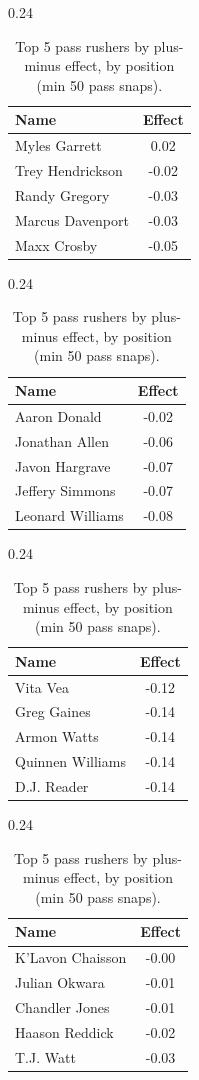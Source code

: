 \begin{table}[h!]
\centering
\begin{subtable}{0.24\textwidth}
\centering
\footnotesize
\begin{tabular}{lc}
\toprule
Name & Effect \\
\midrule
Myles Garrett & 0.02 \\
Trey Hendrickson & -0.02 \\
Randy Gregory & -0.03 \\
Marcus Davenport & -0.03 \\
Maxx Crosby & -0.05 \\
\bottomrule
\end{tabular}
\caption{DE}
\end{subtable}
\hfill
\begin{subtable}{0.24\textwidth}
\centering
\footnotesize
\begin{tabular}{lc}
\toprule
Name & Effect \\
\midrule
Aaron Donald & -0.02 \\
Jonathan Allen & -0.06 \\
Javon Hargrave & -0.07 \\
Jeffery Simmons & -0.07 \\
Leonard Williams & -0.08 \\
\bottomrule
\end{tabular}
\caption{DT}
\end{subtable}
\hfill
\begin{subtable}{0.24\textwidth}
\centering
\footnotesize
\begin{tabular}{lc}
\toprule
Name & Effect \\
\midrule
Vita Vea & -0.12 \\
Greg Gaines & -0.14 \\
Armon Watts & -0.14 \\
Quinnen Williams & -0.14 \\
D.J. Reader & -0.14 \\
\bottomrule
\end{tabular}
\caption{NT}
\end{subtable}
\hfill
\begin{subtable}{0.24\textwidth}
\centering
\footnotesize
\begin{tabular}{lc}
\toprule
Name & Effect \\
\midrule
K'Lavon Chaisson & -0.00 \\
Julian Okwara & -0.01 \\
Chandler Jones & -0.01 \\
Haason Reddick & -0.02 \\
T.J. Watt & -0.03 \\
\bottomrule
\end{tabular}
\caption{OLB}
\end{subtable}
\caption{Top 5 pass rushers by plus-minus effect, by position (min 50 pass snaps).}
\label{tab:rusher_pm_top}
\end{table}

